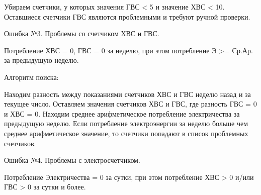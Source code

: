Убираем счетчики, у которых значения ГВС < 5 и значение ХВС < 10.
Оставшиеся счетчики ГВС являются проблемными и требуют ручной проверки.

Ошибка №3. Проблемы со счетчиком ХВС и ГВС.

Потребление ХВС = 0, ГВС = 0 за неделю, при этом потребление Э  >= Ср.Ар. за предыдущую неделю.

Алгоритм поиска:

Находим разность между показаниями счетчиков ХВС и ГВС неделю назад и за текущее число.
Оставляем значения счетчиков ХВС и ГВС, где разность ГВС = 0 и ХВС = 0.
Находим среднее арифметическое потребление электричества за предыдущую неделю.
Если потребление электроэнергии за неделю больше чем среднее арифметическое значение, то счетчики попадают в список проблемных счетчиков.

Ошибка №4. Проблемы с электросчетчиком.

Потребление Электричества = 0 за сутки, при этом потребление ХВС > 0 и/или ГВС > 0 за сутки и более.
